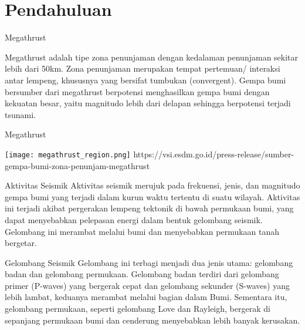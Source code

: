\section{Pendahuluan}
\begin{frame}{Megathrust}
     
    Megathrust adalah tipe zona penunjaman dengan kedalaman 
    penunjaman sekitar lebih dari 50km. Zona penunjaman 
    merupakan tempat pertemuan/ interaksi antar 
    lempeng, khususnya yang bersifat tumbukan (convergent).
    Gempa bumi 
    bersumber dari megathrust berpotensi menghasilkan 
    gempa bumi dengan kekuatan besar, yaitu magnitudo 
    lebih dari delapan sehingga berpotensi terjadi tsunami. 

\end{frame}
\begin{frame}{Megathrust}
    \begin{center}
        \texttt{[image: megathrust\_region.png]}
        \tiny{https://vsi.esdm.go.id/press-release/sumber-gempa-bumi-zona-penunjam-megathrust}
    \end{center}
    
\end{frame}

\begin{frame}{Aktivitas Seismik}
    Aktivitas seismik merujuk pada frekuensi, 
    jenis, dan magnitudo gempa bumi yang terjadi 
    dalam kurun waktu tertentu di suatu wilayah. 
    Aktivitas ini terjadi akibat pergerakan lempeng 
    tektonik di bawah permukaan bumi, yang dapat 
    menyebabkan pelepasan energi dalam bentuk 
    gelombang seismik. Gelombang ini merambat 
    melalui bumi dan menyebabkan permukaan tanah 
    bergetar. 
\end{frame}

\begin{frame}{Gelombang Seismik}
    Gelombang ini terbagi menjadi dua jenis utama: 
    gelombang badan dan gelombang permukaan. 
    Gelombang badan terdiri dari gelombang primer 
    (P-waves) yang bergerak cepat dan gelombang 
    sekunder (S-waves) yang lebih lambat, keduanya 
    merambat melalui bagian dalam Bumi. Sementara 
    itu, gelombang permukaan, seperti gelombang 
    Love dan Rayleigh, bergerak di sepanjang 
    permukaan bumi dan cenderung menyebabkan lebih 
    banyak kerusakan.
\end{frame}
